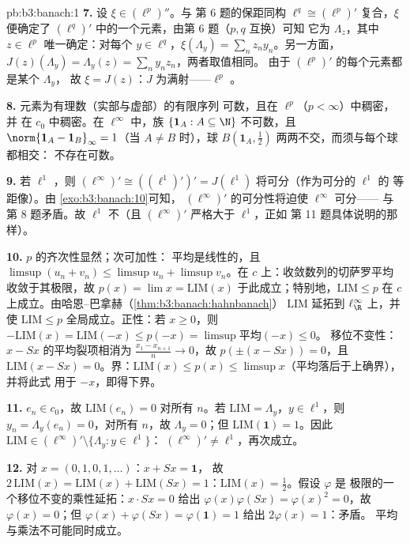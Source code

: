 \begin{solution}{pb:b3:banach:1}
\textbf{7.} 设 $\xi \in (\ell^p)''$。与
第 6 题的保距同构 $\ell^q \cong (\ell^p)'$ 复合，$\xi$ 便确定了
$(\ell^q)'$ 中的一个元素，由第 6 题（$p, q$ 互换）可知
它为 $\Lambda_z$，其中 $z \in \ell^p$ 唯一确定：对每个
$y \in \ell^q$，$\xi(\Lambda_y) = \sum_nz_ny_n$。另一方面，
$J(z)(\Lambda_y) = \Lambda_y(z) = \sum_ny_nz_n$，两者取值相同。
由于 $(\ell^p)'$ 的每个元素都是某个 $\Lambda_y$，
故 $\xi = J(z)$：$J$ 为满射——$\ell^p$ 。

\textbf{8.} 元素为有理数（实部与虚部）的有限序列
可数，且在 $\ell^p$（$p < \infty$）中稠密，并
在 $c_0$ 中稠密。在 $\ell^\infty$ 中，族 $\{\mathbf 1_A : A
\subseteq \N\}$ 不可数，且 $\norm{\mathbf 1_A -
\mathbf 1_B}_\infty = 1$（当 $A \neq B$ 时），球 $B(\mathbf
1_A, \frac12)$ 两两不交，而须与每个球都相交：
不存在可数。

\textbf{9.} 若 $\ell^1$ ，则 $(\ell^\infty)'
\cong ((\ell^1)')' = J(\ell^1)$ 将可分（作为可分的 $\ell^1$ 的
等距像）。由
\cref{exo:b3:banach:10}可知，
$(\ell^\infty)'$ 的可分性将迫使 $\ell^\infty$ 可分——
与第 8 题矛盾。故 $\ell^1$ 不（且
$(\ell^\infty)'$ 严格大于 $\ell^1$，正如
第 11 题具体说明的那样）。

\textbf{10.} $p$ 的齐次性显然；次可加性：
平均是线性的，且 $\limsup(u_n + v_n) \leq \limsup u_n +
\limsup v_n$。在 $c$ 上：收敛数列的切萨罗平均
收敛于其极限，故 $p(x) = \lim x =
\mathrm{LIM}(x)$ 于此成立；特别地，$\mathrm{LIM} \leq p$ 在
$c$ 上成立。由哈恩–巴拿赫（\cref{thm:b3:banach:hahnbanach}）
$\mathrm{LIM}$ 延拓到 $\ell^\infty_\R$ 上，并使 $\mathrm{LIM} \leq p$
全局成立。正性：若 $x \geq 0$，则 $-\mathrm{LIM}(x) =
\mathrm{LIM}(-x) \leq p(-x) = \limsup\text{平均}(-x) \leq 0$。
移位不变性：$x - Sx$ 的平均裂项相消为
$\frac{x_1 - x_{n+1}}n \to 0$，故 $p(\pm(x - Sx)) = 0$，且
$\mathrm{LIM}(x - Sx) = 0$。界：$\mathrm{LIM}(x) \leq p(x)
\leq \limsup x$（平均落后于上确界），并将此式
用于 $-x$，即得下界。

\textbf{11.} $e_n \in c_0$，故 $\mathrm{LIM}(e_n) = 0$
对所有 $n$。若 $\mathrm{LIM} = \Lambda_y$，$y \in \ell^1$，则
$y_n = \Lambda_y(e_n) = 0$，对所有 $n$，故 $\Lambda_y = 0$；但
$\mathrm{LIM}(\mathbf 1) = 1$。因此 $\mathrm{LIM} \in
(\ell^\infty)' \setminus \{\Lambda_y : y \in \ell^1\}$：
$(\ell^\infty)' \neq \ell^1$，再次成立。

\textbf{12.} 对 $x = (0,1,0,1,\dots)$：$x + Sx = \mathbf 1$，
故 $2\,\mathrm{LIM}(x) = \mathrm{LIM}(x) + \mathrm{LIM}(Sx) =
1$：$\mathrm{LIM}(x) = \frac12$。假设 $\varphi$ 是
极限的一个移位不变的乘性延拓：$x\cdot
Sx = 0$ 给出 $\varphi(x)\varphi(Sx) = \varphi(x)^2 = 0$，故
$\varphi(x) = 0$；但 $\varphi(x) + \varphi(Sx) =
\varphi(\mathbf 1) = 1$ 给出 $2\varphi(x) = 1$：矛盾。
平均与乘法不可能同时成立。


\end{solution}
